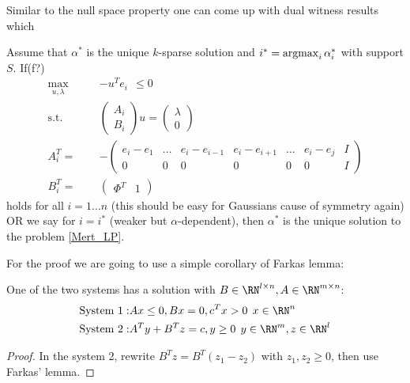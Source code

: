 \documentclass{article} %
\begin{document}
Similar to the null space property one can come up with dual witness results which 
\begin{theorem}
\label{Maxmax_Oneblock}
Assume that $\alpha^*$ is the unique $k$-sparse solution and $i^* = \operatorname{argmax}_i \alpha^*_i$ with support $S$. If(f?)
\begin{align*}
\label{Maxrecovery_condition_Farkas}
\max_{u,\lambda} \qquad &- u^T e_i \:\: \leq 0\\
\text{s.t.} \qquad& \begin{pmatrix} A_i\\ B_i \end{pmatrix} u = \begin{pmatrix} \lambda \\ 0\end{pmatrix}\\
A_i^T = &-\begin{pmatrix} e_i - e_{1} & \dots & e_i - e_{i-1} & e_i - e_{i+1} & \dots & e_i - e_j & I\\
0 & 0 & 0&0&0&0& I
\end{pmatrix}\\
B_i^T = &\begin{pmatrix} \Phi^T & 1\end{pmatrix} 
\end{align*}
holds for all $i = 1\dots n$ (this should be easy for Gaussians cause of symmetry again) OR we say for $i = i^*$ (weaker but $\alpha$-dependent), then $\alpha^*$ is the unique solution to the problem \eqref{Mert_LP}.
\end{theorem}
For the proof we are going to use a simple corollary of Farkas lemma:
\begin{lemma}
\label{Farkas_Corollary}
One of the two systems has a solution with $B \in \RN^{l\times n}, A\in \RN^{m\times n}$:
\begin{align*}
\text{System 1}: & Ax \leq 0, Bx = 0, c^Tx >0\:\: x\in \RN^n\\
\text{System 2}: & A^T y + B^T z = c, y\geq 0\:\: y\in \RN^m, z\in \RN^l
\end{align*}
\end{lemma}
\begin{proof}
In the system 2, rewrite $B^T z = B^T (z_1 - z_2)$ with $z_1,z_2 \geq 0$, then use Farkas' lemma. 
\end{proof}
\end{document}
